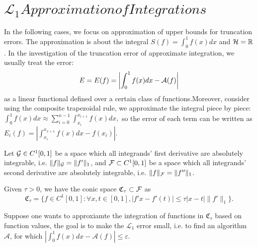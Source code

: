 \documentclass[12pt]{article}
\begin{document}
\section{$\mathcal{L}_{1} Approximation of Integrations$}
In the following cases, we focus on approximation of upper bounds for truncation errors. The approximation is about the integral $S(f)=\int_{0}^{1}f(x)dx$ and $\mathcal{H}=\mathbb{R}$. In the investigation of the truncation error of approximate integration, we usually treat the error:
$$E=E(f)=\left|\int_{0}^{1}f(x)dx-\mathcal{A}(f)\right|$$
as a linear functional defined over a certain class of functions.Moreover, consider using the composite trapezoidal rule, we approximate the integral piece by piece:
$\int_{0}^{1}f(x)dx\approx\sum_{i=0}^{n-1}\int_{x_{i}}^{x_{i+1}}f(x)dx,$ so the error of each term can be written as $E_i(f)=|\int_{x_{i}}^{x_{x+1}}f(x)dx-f(x_i)|$.

Let $\mathcal{G}\in C^{1}[0,1]$ be a space which all integrands' first derivative are absolutely integrable, i.e. $\|f\|_{\mathcal{G}}=\|f'\|_{1}$, and $\mathcal{F}\subset C^{1}[0,1]$ be a space which all integrands' second derivative are absolutely integrable, i.e. $\|f\|_{\mathcal{F}}=\|f''\|_{1}$.

Given $\tau > 0$, we have the conic space $\mathfrak{C}_{\tau} \subset \mathcal{F}$ as $$\mathfrak{C}_{\tau}=\{f\in C^{1}[0,1]:\forall x,t \in[0,1], |f'{x}-f'(t)|\leq\tau|x-t|\|f'\|_1\}.$$

Suppose one wants to approxiamte the integration of functions in $\mathfrak{C}_{\tau}$ based on function values, the goal is to make the $\mathcal{L}_1$ error small, i.e. to find an algorithm $\mathcal{A}$, for which $|\int_{0}^{1}f(x)dx-\mathcal{A}(f)|\leq \varepsilon$.
\end{document}
